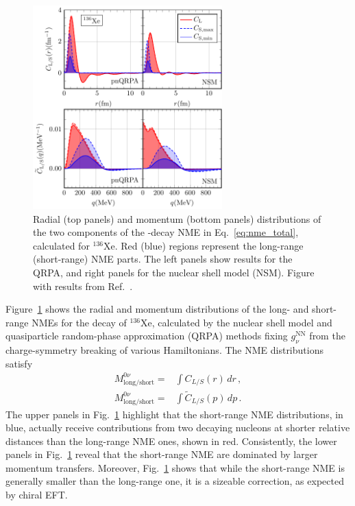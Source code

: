 \begin{figure}[t]
	\begin{center}
	\includegraphics[width=0.65\textwidth]{img/136Xe-QRPA-NSM.pdf}
	\caption{Radial (top panels) and momentum (bottom panels) distributions of the two components of the \bbonu-decay NME in Eq.~\eqref{eq:nme_total}, calculated for $^{136}$Xe. Red (blue) regions represent the long-range (short-range) NME parts. The left panels show results for the QRPA, and right panels for the nuclear shell model (NSM). Figure with results from Ref.~\cite{Jokiniemi:2021qqv}. \label{fig:NME_density}}
\end{center}
\end{figure}

Figure~\ref{fig:NME_density} shows the radial and momentum distributions of the long- and short-range NMEs for the decay of $^{136}$Xe, calculated by the nuclear shell model and quasiparticle random-phase approximation (QRPA) methods fixing $g^\text{NN}_\nu$ from the charge-symmetry breaking of various Hamiltonians. The NME distributions satisfy
\begin{align}
M^{0\nu}_{\text{long/short}}=&\int C_{L/S}(r)\, d r\,, \\
M^{0\nu}_{\text{long/short}}=&\int \widetilde{C}_{L/S}(p)\, d p\,.
\end{align}
The upper panels in Fig.~\ref{fig:NME_density} highlight that the short-range NME distributions, in blue, actually receive contributions from two decaying nucleons at shorter relative distances than the long-range NME ones, shown in red. Consistently, the lower panels in Fig.~\ref{fig:NME_density} reveal that the short-range NME are dominated by larger momentum transfers. Moreover, Fig.~\ref{fig:NME_density} shows that while the short-range NME is generally smaller than the long-range one, it is a sizeable correction, as expected by chiral EFT.




